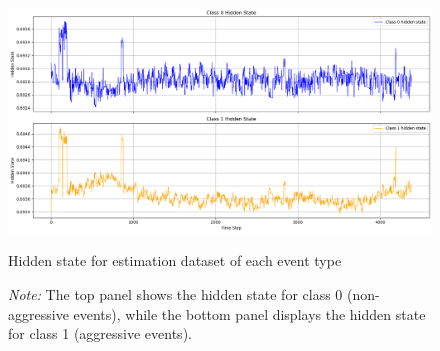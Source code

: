 \begin{figure}[htbp]
    \centering
    \includegraphics[width=0.95\linewidth]{figures/train-hidden-state.png}
    \caption{Hidden state for estimation dataset of each event type}
    \caption*{\textit{Note:} The top panel shows the hidden state for class 0 (non-aggressive events), while the bottom panel displays the hidden state for class 1 (aggressive events).}
    \label{fig:train-hidden-state}
\end{figure}


